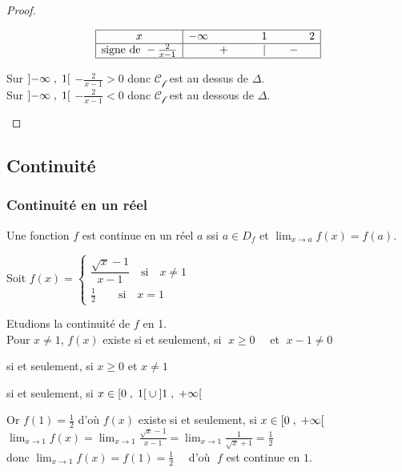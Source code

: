 \begin{proof}
\begin{enumerate}
  \[\begin{array}{|c|ccccc|}
\hline
x & -\infty & & 1 & & 2\\ \hline
\text{signe de }-\frac{2}{x-1}  & & +\qquad &|  & \quad - & \\
\hline
\end{array}\]
 
  Sur $ \left]-\infty \;,\; 1\right[ $ $-\frac{2}{x-1} > 0  $ donc $ \mathcal{C_{f}} $ est au dessus de $ \Delta. $\\
   Sur $ \left]-\infty \;,\; 1\right[ $ $-\frac{2}{x-1} < 0  $ donc $ \mathcal{C_{f}} $ est au dessous de $ \Delta. $
\end{enumerate}
\end{proof}
\subsection{Continuité}
\subsubsection*{Continuité en un réel}

\begin{definition}
Une fonction $ f $ est continue en un réel $ a $ ssi $ a\in D_{f} $ et $\displaystyle \lim_{x \to a}f(x)=f(a) $.
\end{definition}


\begin{example}
Soit $ f (x)=\left\{\begin{array}{l} \dfrac{\sqrt{x}-1}{x-1}\quad \textrm{si} \quad x\neq 1 \\ \frac{1}{2}\quad \quad\textrm{si}\quad x= 1  \end{array} \right.$


Etudions la continuité   de $ f $ en 1.\\
 Pour $x\neq 1  $, $ f(x) $ existe si et seulement, si $\; x\geq 0 \quad$ et $\; x-1 \neq 0 $
 
si et seulement, si \quad $x\geq 0$ \quad   et $x\neq 1$

si et seulement, si $x\in \left[0 \;,\; 1\right[\cup\left]1 \;,\; +\infty\right[$

Or $ f(1)= \frac{1}{2}$  d'où $ f(x) $ existe si et seulement, si  $x\in \left[0 \;,\; +\infty\right[  $ \\
$ \displaystyle\lim_{x \to 1}f(x)=\displaystyle\lim_{x \to 1}\frac{\sqrt{x}-1}{x-1}= \displaystyle\lim_{x \to 1}\frac{1}{\sqrt{x}+1}= \frac{1}{2}$ \\donc $\displaystyle \lim_{x \to 1}f(x)=f(1)=\frac{1}{2}\quad$ d'où $\; f $ est continue en $ 1. $
\end{example}

